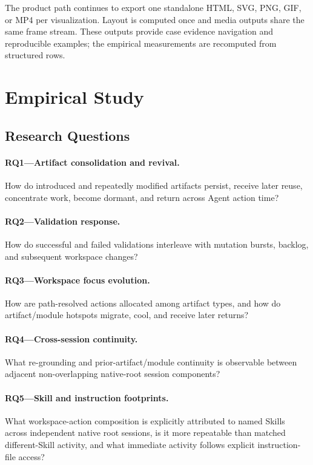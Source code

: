 \documentclass[letterpaper]{article}
\begin{document}
The product path continues to export one standalone HTML, SVG, PNG, GIF, or MP4
per visualization.  Layout is computed once and media outputs share the same
frame stream.  These outputs provide case evidence navigation and reproducible
examples; the empirical measurements are recomputed from structured rows.

\section{Empirical Study}
\label{sec:evaluation}

\subsection{Research Questions}

\paragraph{RQ1---Artifact consolidation and revival.}
How do introduced and repeatedly modified artifacts persist, receive later
reuse, concentrate work, become dormant, and return across Agent action time?

\paragraph{RQ2---Validation response.}
How do successful and failed validations interleave with mutation bursts,
backlog, and subsequent workspace changes?

\paragraph{RQ3---Workspace focus evolution.}
How are path-resolved actions allocated among artifact types, and how do
artifact/module hotspots migrate, cool, and receive later returns?

\paragraph{RQ4---Cross-session continuity.}
What re-grounding and prior-artifact/module continuity is observable between
adjacent non-overlapping native-root session components?

\paragraph{RQ5---Skill and instruction footprints.}
What workspace-action composition is explicitly attributed to named Skills
across independent native root sessions, is it more repeatable than matched
different-Skill activity, and what immediate activity follows explicit
instruction-file access?
\end{document}
